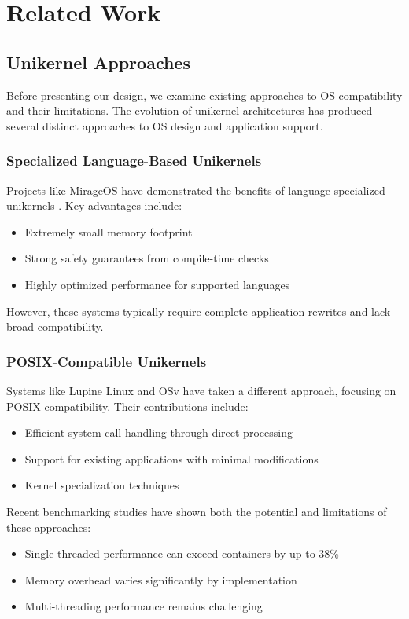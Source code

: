 \documentclass[conference]{IEEEtran}
\begin{document}
\section{Related Work}
\subsection{Unikernel Approaches}
Before presenting our design, we examine existing approaches to OS compatibility and their
limitations. The evolution of unikernel architectures has produced several distinct approaches to OS design and application support.

\subsubsection{Specialized Language-Based Unikernels}
Projects like MirageOS have demonstrated the benefits of language-specialized unikernels \cite{linux_kernel_clothing}. Key advantages include:
\begin{itemize}
	\item Extremely small memory footprint
	\item Strong safety guarantees from compile-time checks
	\item Highly optimized performance for supported languages
\end{itemize}

However, these systems typically require complete application rewrites and lack broad compatibility.

\subsubsection{POSIX-Compatible Unikernels}
Systems like Lupine Linux \cite{linux_kernel_clothing} and OSv have taken a different approach, focusing on POSIX compatibility. Their contributions include:
\begin{itemize}
	\item Efficient system call handling through direct processing
	\item Support for existing applications with minimal modifications
	\item Kernel specialization techniques
\end{itemize}

Recent benchmarking studies \cite{unikernels_vs_containers} have shown both the potential and limitations of these approaches:
\begin{itemize}
	\item Single-threaded performance can exceed containers by up to 38\%
	\item Memory overhead varies significantly by implementation
	\item Multi-threading performance remains challenging
\end{itemize}
\end{document}
